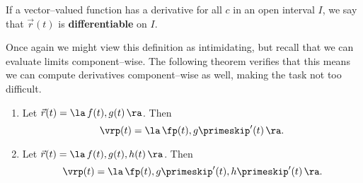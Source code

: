 
If a vector--valued function  has a derivative for all $c$ in an open interval $I$, we say that $\vec r(t)$ is \textbf{differentiable} on $I$.

Once again we might view this definition as intimidating, but recall that we can evaluate limits component--wise. The following theorem verifies that this means we can compute derivatives component--wise as well, making the task not too difficult.
\enlargethispage{2\baselineskip}

{\begin{enumerate}
	\item Let $\vec r(t) = \la \, f(t), g(t)\,\ra$. Then 
	$$\vrp(t) = \la\, \fp(t), g\primeskip'(t)\, \ra.$$
	\item Let $\vec r(t) = \la \, f(t), g(t), h(t)\,\ra$. Then
	$$\vrp(t) = \la\, \fp(t), g\primeskip'(t), h\primeskip'(t)\, \ra.$$
\end{enumerate}
}\\

